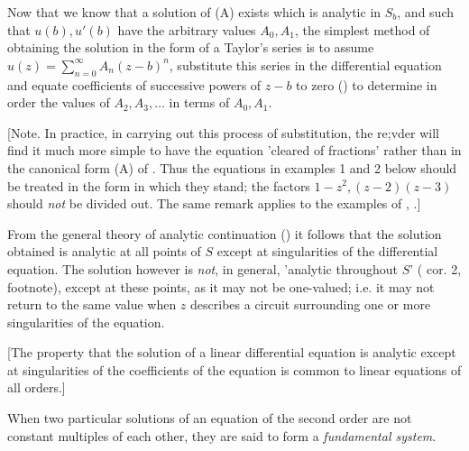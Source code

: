 Now that we know that a solution of (A) %
exists which is analytic in $S_{b}$,
and such that $u(b), u'(b)$ have the arbitrary values
$A_{0}, A_{1}$, the simplest method of obtaining the
solution in the form of a Taylor's series is to assume
$u(z) = \sum_{n=0}^{\infty} A_{n} (z-b)^{n}$, substitute this
series in the differential equation and
equate coefficients of successive powers of $z-b$ to zero
() to
determine in order the values of
$A_{2}, A_{3}, \ldots$ in terms of $A_{0}, A_{1}$.

[Note. In practice, in carrying out this process of substitution, the
re;vder will find it much more simple to have the equation 'cleared of
fractions' rather than in the canonical form (A) %
of . Thus the
equations in examples 1 and 2 %
below should be treated in the form in
which they stand; the factors
$1 - z^{2}, (z-2)(z-3)$
should \emph{not} be
divided out. The same remark applies to the examples of
, .] %

From the general theory of analytic continuation () it follows
that the solution obtained is analytic at all points of $S$ except at
singularities of the differential equation. The solution however is
\emph{not}, in general, 'analytic throughout $S$'
( cor. 2, footnote), %
except at these points, as it may not be one-valued; i.e. it may not
return to the same value when $z$ describes a circuit surrounding one or
more singularities of the equation.
%
%

[The property that the solution of a linear differential equation is
analytic except at singularities of the coefficients of the equation
is common to linear equations of all orders.]

When two particular solutions of an equation of the second order are
not constant multiples of each other, they are said to form a
\emph{fundamental system}.

